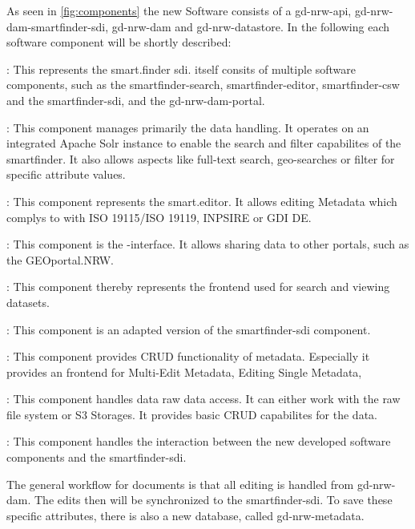 \documentclass[11pt, titlepage, a4paper]{article}
\begin{document}
As seen in \ref{fig:components} the new Software consists of a gd-nrw-api, gd-nrw-dam-smartfinder-sdi, gd-nrw-dam and gd-nrw-datastore.
In the following each software component will be shortly described:
\begin{description}[]
	\item[gd-nrw-dam-smartfinder-sdi]: This represents the smart.finder sdi. itself consits of multiple software components, such as the smartfinder-search, smartfinder-editor, smartfinder-csw and the smartfinder-sdi, and the gd-nrw-dam-portal.
	      \begin{description}[]
		      \item[smartfinder-search]: This component manages primarily the data handling. It operates on an integrated Apache Solr instance to enable the search and filter capabilites of the smartfinder. It also allows aspects like full-text search, geo-searches or filter for specific attribute values.
		      \item[smartfinder-editor]: This component represents the smart.editor. It allows editing Metadata which complys to with ISO 19115/ISO 19119, INPSIRE or GDI DE.
		      \item[smartfinder-csw]: This component is the  -interface. It allows sharing data to other portals, such as the GEOportal.NRW.
		      \item[smartfinder-sdi]: This component thereby represents the frontend used for search and viewing datasets.
		      \item[gd-nrw-dam-portal]: This component is an adapted version of the smartfinder-sdi component.
	      \end{description}
	\item[gd-nrw-dam]: This component provides  CRUD functionality of metadata. Especially it provides an frontend for Multi-Edit Metadata, Editing Single Metadata,
	\item[gd-nrw-datastore]: This component handles data raw data access. It can either work with the raw file system or S3 Storages. It provides basic CRUD capabilites for the data.
	\item[gd-nrw-api]: This component handles the interaction between the new developed software components and the smartfinder-sdi.
\end{description}
The general workflow for documents is that all editing is handled from gd-nrw-dam. The edits then will be synchronized to the smartfinder-sdi.
To save these  specific attributes, there is also a new database, called gd-nrw-metadata.
\end{document}
